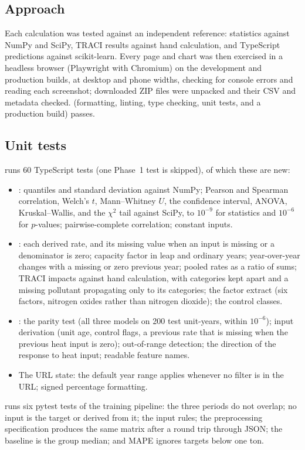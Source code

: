 \documentclass[11pt,a4paper]{article}
\begin{document}
\subsection{Approach}

Each calculation was tested against an independent reference: statistics against NumPy and
SciPy, TRACI results against hand calculation, and TypeScript predictions against scikit-learn.
Every page and chart was then exercised in a headless browser (Playwright with Chromium) on the
development and production builds, at desktop and phone widths, checking for console errors and
reading each screenshot; downloaded ZIP files were unpacked and their CSV and metadata checked.
 (formatting, linting, type checking, unit tests, and a production build)
passes.

\subsection{Unit tests}

 runs 60 TypeScript tests (one Phase~1 test is skipped), of which these are new:
\begin{itemize}
  \item {}: quantiles and standard deviation against NumPy; Pearson and Spearman
        correlation, Welch's $t$, Mann--Whitney $U$, the confidence interval, ANOVA,
        Kruskal--Wallis, and the $\chi^2$ tail against SciPy, to $10^{-9}$ for statistics and
        $10^{-6}$ for $p$-values; pairwise-complete correlation; constant inputs.
  \item {}: each derived rate, and its missing value when an input is
        missing or a denominator is zero; capacity factor in leap and ordinary years;
        year-over-year changes with a missing or zero previous year; pooled rates as a ratio of
        sums; TRACI impacts against hand calculation, with categories kept apart and a missing
        pollutant propagating only to its categories; the factor extract (six factors, nitrogen
        oxides rather than nitrogen dioxide); the control classes.
  \item {}: the parity test (all three models on 200 test unit-years, within
        $10^{-6}$); input derivation (unit age, control flags, a previous rate that is missing
        when the previous heat input is zero); out-of-range detection; the direction of the
        response to heat input; readable feature names.
  \item The URL state: the default year range applies whenever no filter is in the URL; signed
        percentage formatting.
\end{itemize}
 runs six pytest tests of the training pipeline: the three periods do not
overlap; no input is the target or derived from it; the input rules; the preprocessing
specification produces the same matrix after a round trip through JSON; the baseline is the
group median; and MAPE ignores targets below one ton.
\end{document}
